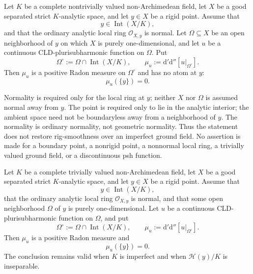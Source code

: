 
\begin{lemma}
\label{lem:p21p3-componentwise-normal-rigid-zero-atom}
Let $K$ be a complete nontrivially valued non-Archimedean field, let $X$ be
a good separated strict $K$-analytic space, and let $y\in X$ be a rigid
point.  Assume that
\[
                         y\in\operatorname{Int}(X/K),
\]
and that the ordinary analytic local ring $\mathcal O_{X,y}$ is normal.
Let $\Omega\subseteq X$ be an open neighborhood of $y$ on which $X$ is
purely one-dimensional, and let $u$ be a continuous
CLD-plurisubharmonic function on $\Omega$.  Put
\[
 \Omega^\circ:=\Omega\cap\operatorname{Int}(X/K),
 \qquad
 \mu_u:=\mathrm d'\mathrm d''[u|_{\Omega^\circ}].
\]
Then $\mu_u$ is a positive Radon measure on $\Omega^\circ$ and has no atom
at $y$:
\begin{equation}
\label{eq:p213-normal-rigid-zero-atom}
                         \mu_u(\{y\})=0.
\end{equation}
\end{lemma}

\begin{remark}
\label{rem:p213-normal-rigid-zero-atom-scope}
Normality is required only for the local ring at $y$; neither $X$ nor
$\Omega$ is assumed normal away from $y$.  The point is required only to
lie in the analytic interior; the ambient space need not be boundaryless
away from a neighborhood of $y$.  The normality is ordinary normality, not
geometric normality.  Thus the statement does not restore rig-smoothness
over an imperfect ground field.  No assertion is made for a boundary point,
a nonrigid point, a nonnormal local ring, a trivially valued ground field,
or a discontinuous psh function.
\end{remark}


\begin{lemma}
\label{lem:p213-trivial-gauss-rigid-zero-atom}
Let $K$ be a complete trivially valued non-Archimedean field, let $X$ be
a good separated strict $K$-analytic space, and let $y\in X$ be a rigid
point.  Assume that
\[
                         y\in\operatorname{Int}(X/K),
\]
that the ordinary analytic local ring $\mathcal O_{X,y}$ is normal, and
that some open neighborhood $\Omega$ of $y$ is purely one-dimensional.
Let $u$ be a continuous CLD-plurisubharmonic function on $\Omega$, and put
\[
 \Omega^\circ:=\Omega\cap\operatorname{Int}(X/K),
 \qquad
 \mu_u:=\mathrm d'\mathrm d''[u|_{\Omega^\circ}].
\]
Then $\mu_u$ is a positive Radon measure and
\begin{equation}
\label{eq:p213-trivial-gauss-rigid-zero-atom}
                         \mu_u(\{y\})=0.
\end{equation}
The conclusion remains valid when $K$ is imperfect and when
$\mathscr H(y)/K$ is inseparable.
\end{lemma}


